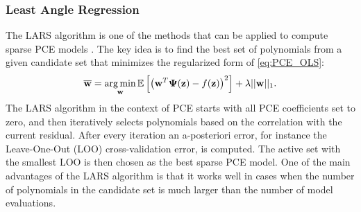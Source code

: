 \subsubsection{Least Angle Regression}
The LARS algorithm \cite{efron2004} is one of the methods that can be applied to compute sparse PCE models \cite{BlatmanThesis}. The key idea is to find the best set of polynomials from a given candidate set that minimizes the regularized form of \eqref{eq:PCE_OLS}:
\begin{equation}\label{regularized_LS}
\mathbf{\overline{w}} = \operatorname*{arg\,min}_{\mathbf{w}} \mathbb{E}\left[\left(\mathbf{w}^T \boldsymbol{\Psi}(\mathbf{z}) - f(\mathbf{z})\right)^2\right] + \lambda ||\mathbf{w}||_1.
\end{equation}
The LARS algorithm in the context of PCE starts with all PCE coefficients set to zero, and then iteratively selects polynomials based on the correlation with the current residual. After every iteration an a-posteriori error, for instance the Leave-One-Out (LOO) cross-validation error, is computed. The active set with the smallest LOO is then chosen as the best sparse PCE model. One of the main advantages of the LARS algorithm is that it works well in cases when the number of polynomials in the candidate set is much larger than the number of model evaluations.


